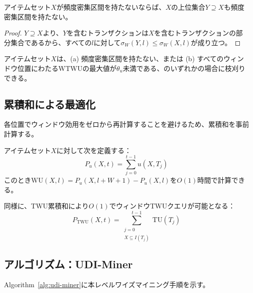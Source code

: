 \begin{lemma}[頻度に関する密集区間の反単調性]
\label{lem:freq-antimonotone}
アイテムセット$X$が頻度密集区間を持たないならば、$X$の上位集合$Y \supseteq X$も頻度密集区間を持たない。
\end{lemma}

\begin{proof}
$Y \supseteq X$より、$Y$を含むトランザクションは$X$を含むトランザクションの部分集合であるから、すべての$l$に対して$\sigma_W(Y, l) \leq \sigma_W(X, l)$が成り立つ。
\end{proof}

\begin{corollary}[同時枝刈り]
\label{cor:joint}
アイテムセット$X$は、(a) 頻度密集区間を持たない、または (b) すべてのウィンドウ位置にわたるWTWUの最大値が$\theta_u$未満である、のいずれかの場合に枝刈りできる。
\end{corollary}

\subsection{累積和による最適化}

各位置でウィンドウ効用をゼロから再計算することを避けるため、累積和を事前計算する。

\begin{definition}[効用累積和]
アイテムセット$X$に対して次を定義する：
\begin{equation}
    P_u(X, t) = \sum_{j=0}^{t-1} u(X, T_j)
\end{equation}
このとき$\text{WU}(X, l) = P_u(X, l{+}W{+}1) - P_u(X, l)$を$O(1)$時間で計算できる。
\end{definition}

同様に、TWU累積和により$O(1)$でウィンドウTWUクエリが可能となる：
\begin{equation}
    P_{\text{TWU}}(X, t) = \sum_{\substack{j=0 \\ X \subseteq I(T_j)}}^{t-1} \text{TU}(T_j)
\end{equation}

\subsection{アルゴリズム：UDI-Miner}

Algorithm~\ref{alg:udi-miner}に本レベルワイズマイニング手順を示す。

